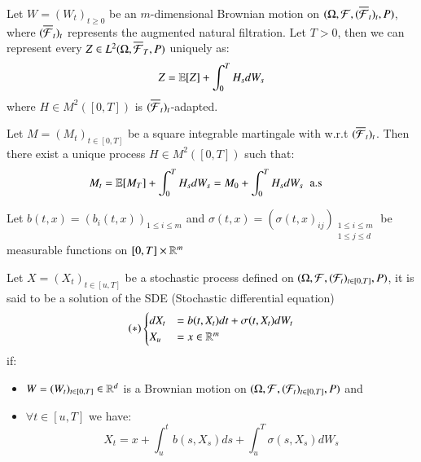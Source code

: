 \begin{theorem}
Let $W = (W_{t})_{t\geq 0}$ be an $m$-dimensional Brownian motion on $(\Omega, \mathcal{F}, (\overline{\mathcal{F}}_{t})_{t}, P)$, where $(\overline{\mathcal{F}}_{t})_{t}$ represents the augmented natural filtration. Let $T>0$, then we can represent every $Z\in L^{2}(\Omega, \overline{\mathcal{F}}_{T}, P)$ uniquely as: 
$$
Z = \mathbb{E}[Z] + \int_{0}^{T}H_{s}dW_{s}
$$
where $H \in M^{2}([0,T])$ is $(\overline{\mathcal{F}}_{t})_{t}$-adapted.
\end{theorem}

\begin{theorem}
\label{thm: Martingale_rep_thm}
Let $M = (M_{t})_{t \in [0,T]}$ be a square integrable martingale with w.r.t $(\overline{\mathcal{F}}_{t})_{t}$. Then there exist a unique process $H\in M^{2}([0,T])$ such that: 
\begin{align*}
M_{t} &= \mathbb{E}[M_{T}] + \int_{0}^{T}H_{s}dW_{s} 
= M_{0} + \int_{0}^{T}H_{s}dW_{s} \;\; \text{a.s}
\end{align*}
\end{theorem}

Let $b(t,x) = (b_{i}(t,x))_{1\leq i \leq m}$ and
$\sigma(t,x) = (\sigma(t,x)_{ij})_{\substack{1\leq i\leq m\\1\leq j\leq d}}$ be measurable functions on $[0,T]\times \mathbb{R}^{m}$
\begin{definition}
Let $X = (X_{t})_{t\in [u,T]}$ be a stochastic process defined on $(\Omega, \mathcal{F}, (\mathcal{F}_{t})_{t\in [0,T]}, P)$, it is said to be a solution of the SDE (Stochastic differential equation)
\begin{align*}
(*)\begin{cases}
      dX_{t} &= b(t,X_{t})dt + \sigma(t,X_{t})dW_{t} \\
      X_{u} &= x \in \mathbb{R}^{m}
    \end{cases}       
\end{align*}
if: 
\begin{itemize}[leftmargin =*]
    \item $W = (W_{t})_{t\in [0,T]} \in \mathbb{R}^{d}$ is a Brownian motion on $(\Omega, \mathcal{F}, (\mathcal{F}_{t})_{t\in [0,T]}, P)$ and
    \item $\forall t \in [u,T]$ we have:
    $$
    X_{t} = x + \int_{u}^{t}b(s,X_{s})ds + \int_{u}^{T}\sigma(s,X_{s})dW_{s}
    $$
\end{itemize}
\end{definition}

